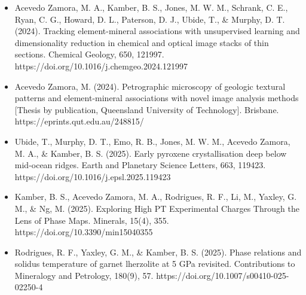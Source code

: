 \begin{itemize}
\begin{itemize}
				\item Acevedo Zamora, M. A., Kamber, B. S., Jones, M. W. M., Schrank, C. E., Ryan, C. G., Howard, D. L., Paterson, D. J., Ubide, T., \& Murphy, D. T. (2024). Tracking element-mineral associations with unsupervised learning and dimensionality reduction in chemical and optical image stacks of thin sections. Chemical Geology, 650, 121997. https://doi.org/10.1016/j.chemgeo.2024.121997
				
				\item Acevedo Zamora, M. (2024). Petrographic microscopy of geologic textural patterns and element-mineral associations with novel image analysis methods [Thesis by publication, Queensland University of Technology]. Brisbane. https://eprints.qut.edu.au/248815/
				
				\item Ubide, T., Murphy, D. T., Emo, R. B., Jones, M. W. M., Acevedo Zamora, M. A., \& Kamber, B. S. (2025). Early pyroxene crystallisation deep below mid-ocean ridges. Earth and Planetary Science Letters, 663, 119423. https://doi.org/10.1016/j.epsl.2025.119423
				
				\item Kamber, B. S., Acevedo Zamora, M. A., Rodrigues, R. F., Li, M., Yaxley, G. M., \& Ng, M. (2025). Exploring High PT Experimental Charges Through the Lens of Phase Maps. Minerals, 15(4), 355. https://doi.org/10.3390/min15040355
				
				\item Rodrigues, R. F., Yaxley, G. M., \& Kamber, B. S. (2025). Phase relations and solidus temperature of garnet lherzolite at 5 GPa revisited. Contributions to Mineralogy and Petrology, 180(9), 57. https://doi.org/10.1007/s00410-025-02250-4			
				
			\end{itemize}	
		
	\end{itemize}
	

